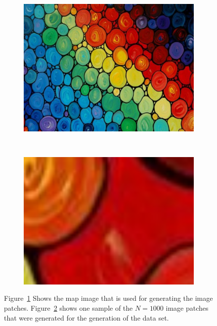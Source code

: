 \documentclass{article}
\begin{document}
\begin{figure}
  \centering
  \begin{subfigure}[b]{0.4\textwidth}
    \includegraphics[width=\textwidth]{rainbow}
    \label{fig:mapimage}
  \end{subfigure}%
~
  \begin{subfigure}[b]{0.4\textwidth}
    \includegraphics[width=\textwidth]{patch}
    \label{fig:patch}
  \end{subfigure}
  \caption{Figure~\ref{fig:mapimage} Shows the map image that is used
    for generating the image patches. Figure~\ref{fig:patch} shows one
    sample of the $N = 1000$ image patches that were generated for the
  generation of the data set.}
\label{fig:generation}
\end{figure}
\end{document}
